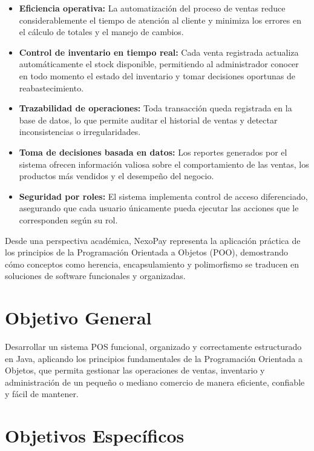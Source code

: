\documentclass[12pt,a4paper]{report}
\begin{document}
\begin{itemize}
    \item \textbf{Eficiencia operativa:} La automatización del proceso de ventas reduce considerablemente el tiempo de atención al cliente y minimiza los errores en el cálculo de totales y el manejo de cambios.
    \item \textbf{Control de inventario en tiempo real:} Cada venta registrada actualiza automáticamente el stock disponible, permitiendo al administrador conocer en todo momento el estado del inventario y tomar decisiones oportunas de reabastecimiento.
    \item \textbf{Trazabilidad de operaciones:} Toda transacción queda registrada en la base de datos, lo que permite auditar el historial de ventas y detectar inconsistencias o irregularidades.
    \item \textbf{Toma de decisiones basada en datos:} Los reportes generados por el sistema ofrecen información valiosa sobre el comportamiento de las ventas, los productos más vendidos y el desempeño del negocio.
    \item \textbf{Seguridad por roles:} El sistema implementa control de acceso diferenciado, asegurando que cada usuario únicamente pueda ejecutar las acciones que le corresponden según su rol.
\end{itemize}

Desde una perspectiva académica, NexoPay representa la aplicación práctica de los principios de la Programación Orientada a Objetos (POO), demostrando cómo conceptos como herencia, encapsulamiento y polimorfismo se traducen en soluciones de software funcionales y organizadas.

\section{Objetivo General}

Desarrollar un sistema POS funcional, organizado y correctamente estructurado en Java, aplicando los principios fundamentales de la Programación Orientada a Objetos, que permita gestionar las operaciones de ventas, inventario y administración de un pequeño o mediano comercio de manera eficiente, confiable y fácil de mantener.

\section{Objetivos Específicos}
\end{document}
